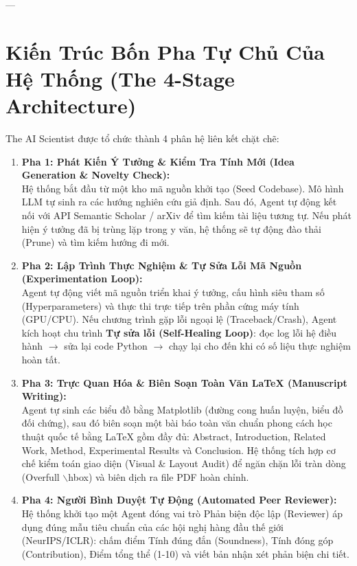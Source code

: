 \documentclass[11pt,a4paper]{article}
\begin{document}
---

\section{Kiến Trúc Bốn Pha Tự Chủ Của Hệ Thống (The 4-Stage Architecture)}

The AI Scientist được tổ chức thành 4 phân hệ liên kết chặt chẽ:

\begin{formulationbox}
\begin{enumerate}[leftmargin=1.5em]
    \item \textbf{Pha 1: Phát Kiến Ý Tưởng \& Kiểm Tra Tính Mới (Idea Generation \& Novelty Check):}\\
    Hệ thống bắt đầu từ một kho mã nguồn khởi tạo (Seed Codebase). Mô hình LLM tự sinh ra các hướng nghiên cứu giả định. Sau đó, Agent tự động kết nối với API Semantic Scholar / arXiv để tìm kiếm tài liệu tương tự. Nếu phát hiện ý tưởng đã bị trùng lặp trong y văn, hệ thống sẽ tự động đào thải (Prune) và tìm kiếm hướng đi mới.

    \item \textbf{Pha 2: Lập Trình Thực Nghiệm \& Tự Sửa Lỗi Mã Nguồn (Experimentation Loop):}\\
    Agent tự động viết mã nguồn triển khai ý tưởng, cấu hình siêu tham số (Hyperparameters) và thực thi trực tiếp trên phần cứng máy tính (GPU/CPU). Nếu chương trình gặp lỗi ngoại lệ (Traceback/Crash), Agent kích hoạt chu trình \textbf{Tự sửa lỗi (Self-Healing Loop)}: đọc log lỗi hệ điều hành $\rightarrow$ sửa lại code Python $\rightarrow$ chạy lại cho đến khi có số liệu thực nghiệm hoàn tất.

    \item \textbf{Pha 3: Trực Quan Hóa \& Biên Soạn Toàn Văn LaTeX (Manuscript Writing):}\\
    Agent tự sinh các biểu đồ bằng Matplotlib (đường cong huấn luyện, biểu đồ đối chứng), sau đó biên soạn một bài báo toàn văn chuẩn phong cách học thuật quốc tế bằng LaTeX gồm đầy đủ: Abstract, Introduction, Related Work, Method, Experimental Results và Conclusion. Hệ thống tích hợp cơ chế kiểm toán giao diện (Visual \& Layout Audit) để ngăn chặn lỗi tràn dòng (Overfull $\backslash$hbox) và biên dịch ra file PDF hoàn chỉnh.

    \item \textbf{Pha 4: Người Bình Duyệt Tự Động (Automated Peer Reviewer):}\\
    Hệ thống khởi tạo một Agent đóng vai trò Phản biện độc lập (Reviewer) áp dụng đúng mẫu tiêu chuẩn của các hội nghị hàng đầu thế giới (NeurIPS/ICLR): chấm điểm Tính đúng đắn (Soundness), Tính đóng góp (Contribution), Điểm tổng thể (1-10) và viết bản nhận xét phản biện chi tiết.
\end{enumerate}
\end{formulationbox}
\end{document}
